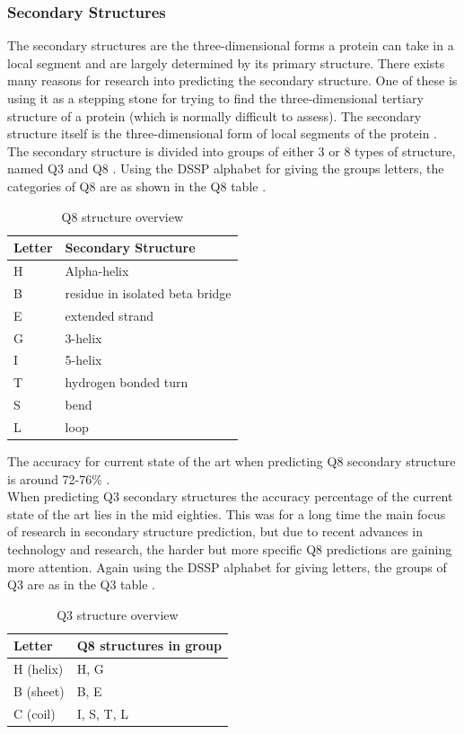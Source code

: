 \subsubsection{Secondary Structures}
The secondary structures are the three-dimensional forms a protein can take in a local segment and are largely determined by its primary structure. There exists many reasons for research into predicting the secondary structure. One of these is using it as a stepping stone for trying to find the three-dimensional tertiary structure of a protein (which is normally difficult to assess). The secondary structure itself is the three-dimensional form of local segments of the protein \citep[p.~2]{qi-et-al-2012}.
The secondary structure is divided into groups of either 3 or 8 types of structure, named Q3 and Q8 \citep{zhou-and-troyanskaya-2014}. 
Using the DSSP alphabet \citep{kabsch-and-sander-1983} 
for giving the groups letters, the categories of Q8 are as shown in the Q8 table \citep{qi-et-al-2012}.
\begin{table}[H]
\caption{Q8 structure overview}
\centering
\begin{tabular}{l|l}
\hline 
Letter	& Secondary Structure 			\\ \hline
H	& Alpha-helix						\\
B	& residue in isolated beta bridge	\\
E	& extended strand					\\
G	& 3-helix							\\
I	& 5-helix							\\
T	& hydrogen bonded turn				\\
S	& bend								\\
L	& loop								\\
\end{tabular}
\end{table}
\noindent The accuracy for current state of the art when predicting Q8 secondary structure is around 72-76\% \citep{zhou-and-troyanskaya-2014, qi-et-al-2012, wang-et-al-2016}. \\
When predicting Q3 secondary structures the accuracy percentage of the current state of the art lies in the mid eighties. This was for a long time the main focus of research in secondary structure prediction, but due to recent advances in technology and research, the harder but more specific Q8 predictions are gaining more attention. 
Again using the DSSP alphabet for giving letters, the groups of Q3 are as in the Q3 table \citep{qi-et-al-2012}.

\begin{table}[H]
\caption{Q3 structure overview}
\centering
\begin{tabular}{l|l}
\hline
Letter		& Q8 structures in group	\\ \hline
H	(helix)		& H, G						\\
B	(sheet)		& B, E						\\
C (coil)	    & I, S, T, L				\\
\end{tabular}
\end{table}

